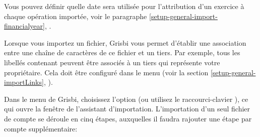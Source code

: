 Vous pouvez définir quelle date sera utilisée pour l'attribution d'un exercice à chaque opération importée, voir le paragraphe \vref{setup-general-import-financialyear}, .

Lorsque vous importez un fichier, Grisbi vous permet d'établir une association entre une chaîne de caractères de ce fichier et un tiers. Par exemple, tous les libellés contenant  peuvent être associés à un tiers qui représente votre propriétaire. Cela doit être configuré dans le menu  (voir la section \vref{setup-general-importLinks}, ).

Dans le menu  de Grisbi, choisissez l'option  (ou utilisez le raccourci-clavier ), ce qui ouvre la fenêtre de l'assistant d'importation. L'importation d'un seul fichier de compte se déroule en cinq étapes, auxquelles il faudra rajouter une étape par compte supplémentaire:
